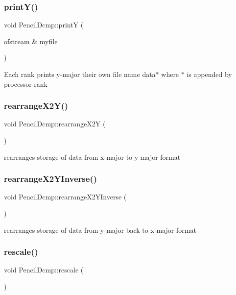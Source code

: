 \subsubsection{\texorpdfstring{print\+Y()}{printY()}}
{\footnotesize\ttfamily void Pencil\+Dcmp\+::printY (\begin{DoxyParamCaption}\item[{ofstream \&}]{myfile }\end{DoxyParamCaption})}

Each rank prints y-\/major their own file name data$\ast$ where \textquotesingle{}$\ast$\textquotesingle{} is appended by processor rank \mbox{\label{classPencilDcmp_ae3d801255b0af3835331825e42043a98}} 
\subsubsection{\texorpdfstring{rearrange\+X2\+Y()}{rearrangeX2Y()}}
{\footnotesize\ttfamily void Pencil\+Dcmp\+::rearrange\+X2Y (\begin{DoxyParamCaption}{ }\end{DoxyParamCaption})}

rearranges storage of data from x-\/major to y-\/major format \mbox{\label{classPencilDcmp_adf77ae1fe6ac288f290e7b588b5a235e}} 
\subsubsection{\texorpdfstring{rearrange\+X2\+Y\+Inverse()}{rearrangeX2YInverse()}}
{\footnotesize\ttfamily void Pencil\+Dcmp\+::rearrange\+X2\+Y\+Inverse (\begin{DoxyParamCaption}{ }\end{DoxyParamCaption})}

rearranges storage of data from y-\/major back to x-\/major format \mbox{\label{classPencilDcmp_a33abfd41b7ea649af6c86f5611aeed79}} 
\subsubsection{\texorpdfstring{rescale()}{rescale()}}
{\footnotesize\ttfamily void Pencil\+Dcmp\+::rescale (\begin{DoxyParamCaption}{ }\end{DoxyParamCaption})}

